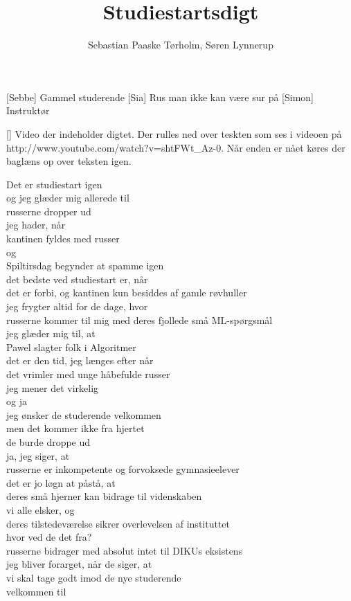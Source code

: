 \documentclass[a4paper,11pt]{article}
\title{Studiestartsdigt}
\author{Sebastian Paaske Tørholm, Søren Lynnerup}
\begin{document}
\maketitle

\begin{roles}
  [Sebbe] Gammel studerende
  [Sia] Rus man ikke kan være sur på
  [Simon] Instruktør
\end{roles}

\begin{props}
    [] Video der indeholder digtet. Der rulles ned over teskten som ses i videoen på http://www.youtube.com/watch?v=shtFWt\_Az-0. Når enden er nået køres der baglæns op over teksten igen.
\end{props}

\begin{sketch}

 Det er studiestart igen\\
og jeg glæder mig allerede til\\
russerne dropper ud\\
jeg hader, når\\
kantinen fyldes med russer\\
og\\
Spiltirsdag begynder at spamme igen\\
det bedste ved studiestart er, når\\
det er forbi, og kantinen kun besiddes af gamle røvhuller\\
jeg frygter altid for de dage, hvor\\
russerne kommer til mig med deres fjollede små ML-spørgsmål\\
jeg glæder mig til, at\\
Pawel slagter folk i Algoritmer\\
det er den tid, jeg længes efter når\\
det vrimler med unge håbefulde russer\\
jeg mener det virkelig\\
og ja\\
jeg ønsker de studerende velkommen\\
men det kommer ikke fra hjertet\\
de burde droppe ud\\
ja, jeg siger, at\\
russerne er inkompetente og forvoksede gymnasieelever\\
det er jo løgn at påstå, at\\
deres små hjerner kan bidrage til videnskaben\\
vi alle elsker, og\\
deres tilstedeværelse sikrer overlevelsen af instituttet\\
hvor ved de det fra?\\
russerne bidrager med absolut intet til DIKUs eksistens\\
jeg bliver forarget, når de siger, at\\
vi skal tage godt imod de nye studerende\\
velkommen til\\
\\


\end{sketch}
\end{document}
